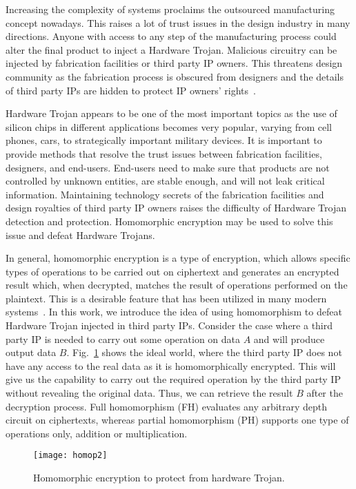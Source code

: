 \documentclass[conference]{IEEEtran}
\begin{document}
Increasing the complexity of systems proclaims the outsourced manufacturing concept nowadays. This raises a lot of trust issues in the design industry in many directions. Anyone with access to any step of the manufacturing process could alter the final product to inject a Hardware Trojan. Malicious circuitry can be injected by fabrication facilities or third party IP owners. This threatens design community as the fabrication process is obscured from designers and the details of third party IPs are hidden to protect IP owners' rights{\color{blue}~\cite{journal:Teh2010}}. 

Hardware Trojan appears to be one of the most important topics as the use of silicon chips in different applications becomes very popular, varying from cell phones, cars, to strategically important military devices. It is important to provide methods that resolve the trust issues between fabrication facilities, designers, and end-users. End-users need to make sure that products are not controlled by unknown entities, are stable enough, and will not leak critical information. Maintaining technology secrets of the fabrication facilities and design royalties of third party IP owners raises the difficulty of Hardware Trojan detection and protection. Homomorphic encryption may be used to solve this issue and defeat Hardware Trojans.

In general, homomorphic encryption is a type of encryption, which allows specific types of operations to be carried out on ciphertext and generates an encrypted result which, when decrypted, matches the result of operations performed on the plaintext. This is a desirable feature that has been utilized in many modern systems{\color{blue}~\cite{conf:Rout12, conf:Hrestak14}}. 
In this work, we introduce the idea of using homomorphism to defeat Hardware Trojan injected in third party IPs. Consider the case where a third party IP is needed to carry out some operation on data $A$ and will produce output data $B$. Fig.~\ref{fig:homop} shows the ideal world, where the third party IP does not have any access to the real data as it is homomorphically encrypted. This will give us the capability to carry out the required operation by the third party IP without revealing the original data. Thus, we can retrieve the result $B$ after the decryption process. Full homomorphism (FH) evaluates any arbitrary depth circuit on ciphertexts, whereas partial homomorphism (PH) supports one type of operations only, addition or multiplication. 

\begin{figure}[htb]
\centering
\texttt{[image: homop2]}
\caption{Homomorphic encryption to protect from hardware Trojan.}
\label{fig:homop}
\end{figure}
\end{document}
